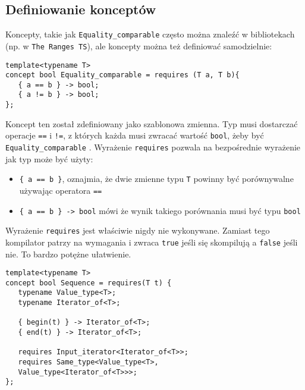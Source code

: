 \documentclass[11pt, a4paper]{article}
\begin{document}
\lstset{language=C++}

\subsection{Definiowanie konceptów}

Koncepty, takie jak \verb#Equality_comparable# często można znaleźć w bibliotekach (np. w \verb#The Ranges TS#), ale koncepty można też definiować samodzielnie: \newline

\begin{lstlisting}[frame=single]
template<typename T>
concept bool Equality_comparable = requires (T a, T b){
   { a == b } -> bool;
   { a != b } -> bool;
};

\end{lstlisting}

Koncept ten został zdefiniowany jako szablonowa zmienna. Typ musi dostarczać operacje \verb#==# i \verb#!=#, z których każda musi zwracać wartość \verb#bool#, żeby być \verb#Equality_comparable#
. Wyrażenie \verb#requires# pozwala na bezpośrednie wyrażenie jak typ może być użyty:

\begin{itemize}

\item \verb#{ a == b }#, oznajmia, że dwie zmienne typu \verb#T# powinny być porównywalne używając operatora \verb#==#

\item \verb#{ a == b } -> bool# mówi że wynik takiego porównania musi być typu \verb#bool#

\end{itemize}

Wyrażenie \verb#requires# jest właściwie nigdy nie wykonywane. Zamiast tego kompilator patrzy na wymagania  i zwraca \verb#true# jeśli się skompilują a \verb#false# jeśli nie. To bardzo potężne ułatwienie. 

\begin{lstlisting}[frame=single]
template<typename T>
concept bool Sequence = requires(T t) {
   typename Value_type<T>;
   typename Iterator_of<T>;
   
   { begin(t) } -> Iterator_of<T>;
   { end(t) } -> Iterator_of<T>;
   
   requires Input_iterator<Iterator_of<T>>;
   requires Same_type<Value_type<T>,
   Value_type<Iterator_of<T>>>;
};

\end{lstlisting}
\end{document}
